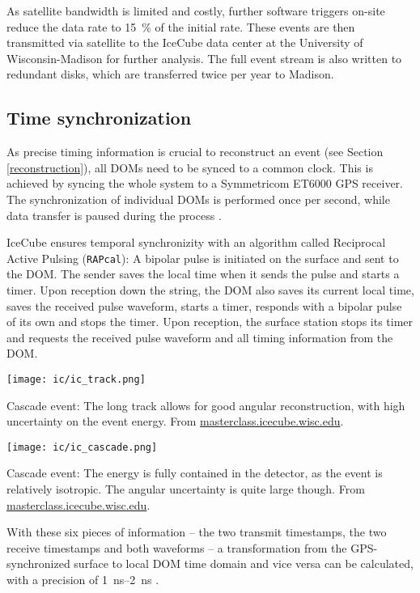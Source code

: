 As satellite bandwidth is limited and costly, further software triggers on-site reduce the data rate to \SI{15}{\percent} of the initial rate. These events are then transmitted via satellite to the IceCube data center at the University of Wisconsin-Madison for further analysis. The full event stream is also written to redundant disks, which are transferred twice per year to Madison.

\subsection{Time synchronization}
As precise timing information is crucial to reconstruct an event (see Section \ref{reconstruction}), all DOMs need to be synced to a common clock. This is achieved by syncing the whole system to a Symmetricom ET6000 GPS receiver. The synchronization of individual DOMs is performed once per second, while data transfer is paused during the process .

IceCube ensures temporal synchronizity with an algorithm called Reciprocal Active Pulsing (\texttt{RAPcal}): A bipolar pulse is initiated on the surface and sent to the DOM. The sender saves the local time when it sends the pulse and starts a timer. Upon reception down the string, the DOM also saves its current local time, saves the received pulse waveform, starts a timer, responds with a bipolar pulse of its own and stops the timer. Upon reception, the surface station stops its timer and requests the received pulse waveform and all timing information from the DOM.
\begin{marginfigure}
    \texttt{[image: ic/ic\_track.png]}
    \caption[Track event in IceCube]{Cascade event: The long track allows for good angular reconstruction, with high uncertainty on the event energy. From \url{masterclass.icecube.wisc.edu}.}
\end{marginfigure}
\begin{marginfigure}
    \texttt{[image: ic/ic\_cascade.png]}
    \caption[Cascade event in IceCube]{Cascade event: The energy is fully contained in the detector, as the event is relatively isotropic. The angular uncertainty is quite large though. From \url{masterclass.icecube.wisc.edu}.}
\end{marginfigure}
With these six pieces of information -- the two transmit timestamps, the two receive timestamps and both waveforms -- a transformation from the GPS-synchronized surface to local DOM time domain and vice versa can be calculated, with a precision of \SIrange{1}{2}{\ns} \cite{Abbasi2009}.


